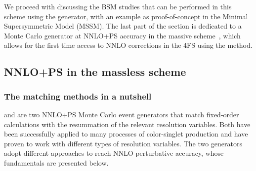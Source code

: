 \documentclass[11pt,a4paper]{article}
\begin{document}
We proceed with discussing the BSM studies that can be performed in this scheme using the \minnlo{} generator, with an example as proof-of-concept in the Minimal Supersymmetric Model (MSSM). The last part of the section is dedicated to a Monte Carlo generator at NNLO+PS accuracy in the massive scheme~\cite{Biello:2024pgo}, which allows for the first time access to NNLO corrections in the 4FS using the \minnlo{} method.

\subsection{NNLO+PS in the massless scheme}\label{sec:5FSNNLOPS}
\subsubsection{The matching methods in a nutshell}

\minnlo{} and \GENEVA{} are two NNLO+PS Monte Carlo event generators
that match fixed-order calculations with the resummation of the
relevant resolution variables. Both have been successfully applied to
many processes of color-singlet production and have proven to work
with different types of resolution variables. The two generators adopt
different approaches to reach NNLO perturbative accuracy, whose
fundamentals are presented below.
\end{document}
